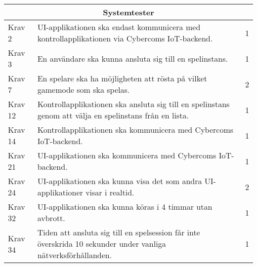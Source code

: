 \documentclass[10pt]{article}
\begin{document}
  \begin{tabular}{| p{2cm} | p{8cm} | p{2cm}|}
	
  \hline
    \multicolumn{3}{|c|}{Systemtester}\\
    \hline
		Krav 2&UI-applikationen ska endast kommunicera med \newline kontrollapplikationen via Cybercoms IoT-backend.&1\\
		\hline
		Krav 3& En användare ska kunna ansluta sig till en spelinstans. & 1 \\
		\hline
		Krav 7& En spelare ska ha möjligheten att rösta på vilket gamemode som ska spelas. & 2 \\
		\hline
		Krav 12& Kontrollapplikationen ska ansluta sig till en spelinstans genom att välja en spelinstans från en lista. & 1 \\
		\hline
		Krav 14& Kontrollapplikationen ska kommunicera med Cybercoms IoT-backend. & 1 \\
		\hline
		Krav 21& UI-applikationen ska kommunicera med Cybercoms IoT-backend. & 1 \\
		\hline
		Krav 24& UI-applikationen ska kunna visa det som andra UI-applikationer visar i realtid. & 2 \\
		\hline
		Krav 32& UI-applikationen ska kunna köras i 4 timmar utan avbrott. & 1 \\
		\hline
		Krav 34& Tiden att ansluta sig till en spelsession får inte överskrida 10 sekunder under vanliga nätverksförhållanden. & 1 \\
		\hline

   
  \end{tabular}
\end{document}
